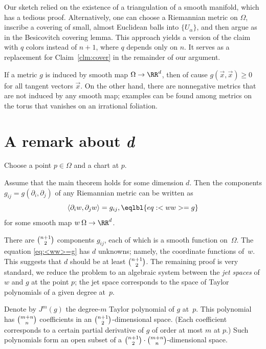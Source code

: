 Our sketch relied on the existence of a triangulation of a smooth manifold, which has a tedious proof.
Alternatively, one can choose a Riemannian metric on $\Omega$, inscribe a covering of small, almost Euclidean balls into $\{U_\alpha\}$, and then argue as in the Besicovitch covering lemma.
This approach yields a version of the claim with $q$ colors instead of $n+1$, where $q$ depends only on $n$.
It serves as a replacement for Claim~\ref{clm:cover} in the remainder of our argument.













If a metric $g$ is induced by smooth map $\Omega\to \RR^d$, then of cause $g(\vec x, \vec x) \ge 0$ for all tangent vectors $\vec x$.
On the other hand, there are nonnegative metrics that are not induced by any smooth map;
examples can be found among metrics on the torus that vanishes on an irrational foliation.












\section{A remark about \textit{d}}



Choose a point $p\in\Omega$ and a chart at $p$.

Assume that the main theorem holds for some dimension $d$.
Then the components $g_{ij}=g(\partial_i,\partial_j)$ of any Riemannian metric can be written as
\[
\langle \partial_i w, \partial_j w \rangle = g_{ij},
\eqlbl{eq:<ww>=g}
\]
for some smooth map $w\:\Omega \to \RR^d$.

There are $\tbinom{n+1}{2}$ components $g_{ij}$, each of which is a smooth function on~$\Omega$.
The equation \ref{eq:<ww>=g} has $d$ unknowns; namely, the coordinate functions of~$w$.
This suggests that $d$ should be at least $\tbinom{n+1}{2}$.
The remaining proof is very standard, we reduce the problem to an algebraic system between the \emph{jet spaces} of $w$ and $g$ at the point $p$; the jet space corresponds to the space of Taylor polynomials of a given degree at~$p$.

Denote by $J^m(g)$ the degree-$m$ Taylor polynomial of $g$ at~$p$.
This polynomial has $\tbinom{m+n}{n}$ coefficients in an $\tbinom{n+1}{2}$-dimensional space.
(Each coefficient corresponds to a certain partial derivative of $g$ of order at most $m$ at $p$.)
Such polynomials form an open subset of a $\tbinom{n+1}{2} \cdot \tbinom{m+n}{n}$-dimensional space.

